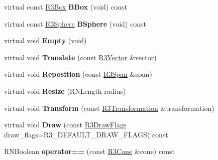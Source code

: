 \begin{DoxyCompactItemize}
\item 
virtual const \hyperlink{class_r3_box}{R3\+Box} {\bfseries B\+Box} (void) const \hypertarget{class_r3_cone_a7e24a29083ef7405f4a2922a48642f05}{}\label{class_r3_cone_a7e24a29083ef7405f4a2922a48642f05}

\item 
virtual const \hyperlink{class_r3_sphere}{R3\+Sphere} {\bfseries B\+Sphere} (void) const \hypertarget{class_r3_cone_a8893fb2ca088972a847e835338af91a3}{}\label{class_r3_cone_a8893fb2ca088972a847e835338af91a3}

\item 
virtual void {\bfseries Empty} (void)\hypertarget{class_r3_cone_a3ccf2169c7d40f0c2949f670880ba070}{}\label{class_r3_cone_a3ccf2169c7d40f0c2949f670880ba070}

\item 
virtual void {\bfseries Translate} (const \hyperlink{class_r3_vector}{R3\+Vector} \&vector)\hypertarget{class_r3_cone_ace1d8f8c316b2ec9d207f15cf97eb4f2}{}\label{class_r3_cone_ace1d8f8c316b2ec9d207f15cf97eb4f2}

\item 
virtual void {\bfseries Reposition} (const \hyperlink{class_r3_span}{R3\+Span} \&span)\hypertarget{class_r3_cone_a0672a8f33cc1e5af79916d16bf225132}{}\label{class_r3_cone_a0672a8f33cc1e5af79916d16bf225132}

\item 
virtual void {\bfseries Resize} (R\+N\+Length radius)\hypertarget{class_r3_cone_a33cee7827565fdc523c03b885671a938}{}\label{class_r3_cone_a33cee7827565fdc523c03b885671a938}

\item 
virtual void {\bfseries Transform} (const \hyperlink{class_r3_transformation}{R3\+Transformation} \&transformation)\hypertarget{class_r3_cone_a513ec910f071fd192b499585cc0f4dbc}{}\label{class_r3_cone_a513ec910f071fd192b499585cc0f4dbc}

\item 
virtual void {\bfseries Draw} (const \hyperlink{class_r_n_flags}{R3\+Draw\+Flags} draw\+\_\+flags=R3\+\_\+\+D\+E\+F\+A\+U\+L\+T\+\_\+\+D\+R\+A\+W\+\_\+\+F\+L\+A\+GS) const \hypertarget{class_r3_cone_a04da8954c8c2519b6873eb14d3cafa14}{}\label{class_r3_cone_a04da8954c8c2519b6873eb14d3cafa14}

\item 
R\+N\+Boolean {\bfseries operator==} (const \hyperlink{class_r3_cone}{R3\+Cone} \&cone) const \hypertarget{class_r3_cone_ace8b3fae2b4d609b43a7ac56cc36fcaa}{}\label{class_r3_cone_ace8b3fae2b4d609b43a7ac56cc36fcaa}


\end{DoxyCompactItemize}
